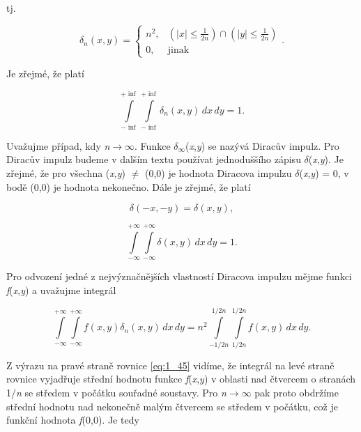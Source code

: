 \noindent tj.

\begin{equation}
    \delta_n(x, y) = \left\{
    \begin{array}{cc}
    n^2, & \left( |x| \leq \frac{1}{2n} \right) \cap \left( |y| \leq \frac{1}{2n} \right) \\
    0, & \mathrm{jinak}
    \end{array} \right. . \nonumber
\end{equation}

Je zřejmé, že platí

\begin{equation} \label{eq:1_42}
    \int\limits_{-\inf}^{+\inf} \int\limits_{-\inf}^{+\inf} \delta_n(x, y)\, dx\, dy = 1.
\end{equation}

Uvažujme případ, kdy \textit{n}$\rightarrow \infty$. Funkce $\delta_\infty$(\textit{x},\textit{y}) se nazývá Diracův impulz. Pro Diracův impulz budeme v dalším textu používat jednoduššího zápisu $\delta$(\textit{x},\textit{y}). Je zřejmé, že pro všechna (\textit{x},\textit{y}) $\neq$ (0,0) je hodnota Diracova impulzu $\delta$(\textit{x},\textit{y}) = 0, v bodě (0,0) je hodnota nekonečno. Dále je zřejmé, že platí

\begin{equation} \label{eq:1_43}
    \delta(-x, -y) = \delta(x, y),
\end{equation}

\begin{equation} \label{eq:1_44}
    \int\limits_{-\infty}^{+\infty} \int\limits_{-\infty}^{+\infty} \delta(x, y)\, dx\, dy = 1.
\end{equation}

Pro odvození jedné z nejvýznačnějších vlastností Diracova impulzu mějme funkci \textit{f}(\textit{x},\textit{y}) a uvažujme integrál

\begin{equation} \label{eq:1_45}
    \int\limits_{-\infty}^{+\infty} \int\limits_{-\infty}^{+\infty} f(x, y) \delta_n(x, y)\, dx\, dy = n^2 \int\limits_{-1/2n}^{1/2n} \int\limits_{1/2n}^{1/2n} f(x, y)\, dx\, dy.
\end{equation}

Z výrazu na pravé straně rovnice \eqref{eq:1_45} vidíme, že integrál na levé straně rovnice vyjadřuje střední hodnotu funkce \textit{f}(\textit{x},\textit{y}) v oblasti nad čtvercem o stranách 1/\textit{n} se středem v počátku souřadné soustavy. Pro \textit{n}$\rightarrow\infty$ pak proto obdržíme střední hodnotu nad nekonečně malým čtvercem se středem v počátku, což je funkční hodnota \textit{f}(0,0). Je tedy

